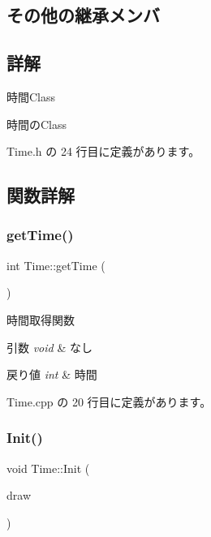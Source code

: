 \subsection*{その他の継承メンバ}


\subsection{詳解}
時間\+Class 

時間の\+Class 

 Time.\+h の 24 行目に定義があります。



\subsection{関数詳解}
\mbox{\label{class_time_af152c078155bff82fc1a0bf402e7a5c6}} 
\subsubsection{\texorpdfstring{get\+Time()}{getTime()}}
{\footnotesize\ttfamily int Time\+::get\+Time (\begin{DoxyParamCaption}{ }\end{DoxyParamCaption})}



時間取得関数 


\begin{DoxyParams}{引数}
{\em void} & なし \\
\hline
\end{DoxyParams}

\begin{DoxyRetVals}{戻り値}
{\em int} & 時間 \\
\hline
\end{DoxyRetVals}


 Time.\+cpp の 20 行目に定義があります。

\mbox{\label{class_time_a807fcbb84acb471c0cd9069b5ba0d8ad}} 
\subsubsection{\texorpdfstring{Init()}{Init()}}
{\footnotesize\ttfamily void Time\+::\+Init (\begin{DoxyParamCaption}\item[{\mbox{\hyperlink{class_draw_base}{Draw\+Base}} $\ast$}]{draw }\end{DoxyParamCaption})}



